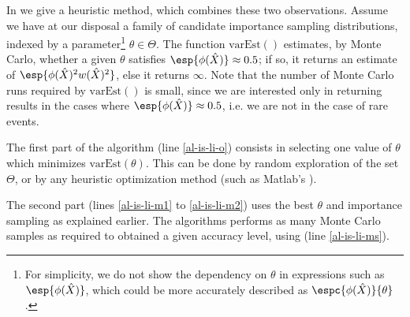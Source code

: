 In  we give a heuristic method, which combines
these two observations. Assume we have at our disposal a family
of candidate importance sampling distributions, indexed by a
parameter\footnote{For simplicity, we do not show the
dependency on $\theta$ in expressions such as
$\esp{\phi(\hat{X})}$, which could be more accurately described
as $\espc{\phi(\hat{X})}{\theta}$.} $\theta\in \Theta$. The
function $\mbox{varEst}()$ estimates, by Monte Carlo, whether a
given $\theta$ satisfies $\esp{\phi(\hat{X})} \approx 0.5$; if
so, it returns an estimate of
$\esp{\phi(\hat{X})^2w(\hat{X})^2} $, else it returns $\infty$.
Note that the number of Monte Carlo runs required by
$\mbox{varEst}()$ is small, since we are interested only in
returning results in the cases where $\esp{\phi(\hat{X})}
\approx 0.5$, i.e. we are not in the case of rare events.

The first part of the algorithm (line \ref{al-is-li-o}) consists in
selecting one value of $\theta$ which minimizes
$\mbox{varEst}(\theta)$. This can be done by random exploration of
the set $\Theta$, or by any heuristic optimization method (such as
Matlab's ).

The second part (lines \ref{al-is-li-m1} to \ref{al-is-li-m2}) uses
the best $\theta$ and importance sampling as explained earlier. The
algorithms performs as many Monte Carlo samples as required to
obtained a given accuracy level, using  (line
\ref{al-is-li-ms}).



